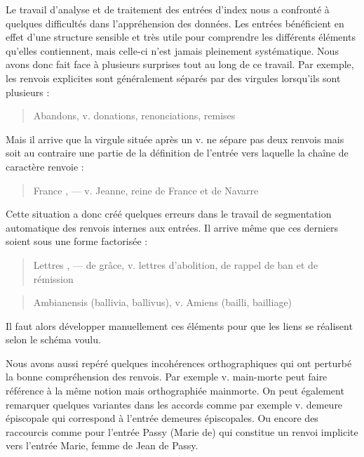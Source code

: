 \documentclass[a4paper,12pt,twoside]{book}
\begin{document}
	Le travail d'analyse et de traitement des entrées d'index nous a confronté à quelques difficultés dans l'appréhension des données. Les entrées bénéficient en effet d'une structure sensible et très utile pour comprendre les différents éléments qu'elles contiennent, mais celle-ci n'est jamais pleinement systématique. Nous avons donc fait face à plusieurs surprises tout au long de ce travail. Par exemple, les renvois explicites sont généralement séparés par des virgules lorsqu'ils sont plusieurs :
	
	\begin{quotation}
		Abandons, v. donations, renonciations, remises
	\end{quotation}

	\noindent Mais il arrive que la virgule située après un \og v.\fg{} ne sépare pas deux renvois mais soit au contraire une partie de la définition de l'entrée vers laquelle la chaîne de caractère renvoie :
	
	\begin{quotation}
		France , — v. Jeanne, reine de France et de Navarre
	\end{quotation}

	\noindent Cette situation a donc créé quelques erreurs dans le travail de segmentation automatique des renvois internes aux entrées. Il arrive même que ces derniers soient sous une forme factorisée :
	
	\begin{quotation}
		Lettres , — de grâce, v. lettres d'abolition, de rappel de
			ban et de rémission
	\end{quotation}

	\begin{quotation}
		Ambianensis (ballivia, ballivus), v. Amiens (bailli, bailliage)
	\end{quotation}

	\noindent Il faut alors développer manuellement ces éléments pour que les liens se réalisent selon le schéma voulu.
	
	Nous avons aussi repéré quelques incohérences orthographiques qui ont perturbé la bonne compréhension des renvois. Par exemple \og v. main-morte\fg{} peut faire référence à la même notion mais orthographiée \og mainmorte\fg{}. On peut également remarquer quelques variantes dans les accords comme par exemple \og v. demeure épiscopale\fg{} qui correspond à l'entrée \og demeures épiscopales\fg{}. Ou encore des raccourcis comme pour l'entrée \og Passy (Marie de)\fg{} qui constitue un renvoi implicite vers l'entrée \og Marie, femme de Jean de Passy\fg{}. 
	
\end{document}
